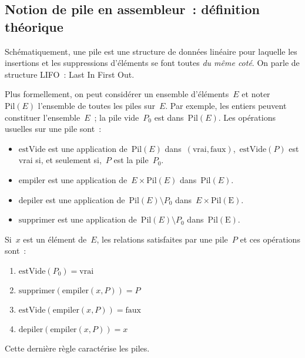 \begin{frame}
  \section{Notion de pile en assembleur~: d\'efinition th\'eorique}
Sch\'ematiquement, une pile est  une structure de donn\'ees lin\'eaire
pour laquelle les insertions et les suppressions d'\'el\'ements se font
toutes \textit{du  m\^eme    cot\'e}.     On  parle    de    structure
LIFO~: Last In First Out.
\par
Plus formellement, on peut consid\'erer un ensemble d'\'el\'ements~$E$
et  noter~$\mathrm{Pil}(E)$ l'ensemble de  toutes  les piles sur~$E$.  
Par  exemple, les entiers peuvent  constituer l'ensemble~$E$~; la pile
vide~$P_{0}$    est dans~$\mathrm{Pil}(E)$.  Les op\'erations usuelles
sur une pile sont~:
\begin{itemize}
\item $\mathrm{estVide}$   est   une application  de~$\mathrm{Pil}(E)$
  dans~${(\mathrm{vrai},\mathrm{faux})}$,~${\mathrm{estVide}(P)}$  est
  vrai si, et seulement si,~$P$ est la pile~$P_{0}$.
\item       $\mathrm{empiler}$         est         une     application
  de~${E\times\mathrm{Pil}(E)}$ dans~${\mathrm{Pil}(E)}$.
\item          $\mathrm{depiler}$          est  une       application
  de~${\mathrm{Pil}(E)\setminus P_{0}}$ dans~$E\times\mathrm{Pil(E)}$.
\item       $\mathrm{supprimer}$        est    une         application
  de~${\mathrm{Pil}(E)\setminus P_{0}}$ dans~$\mathrm{Pil(E)}$.
\end{itemize}
\newpage
Si~$x$ est un  \'el\'ement de~$E$, les  relations satisfaites par une
pile~$P$ et ces op\'erations sont~:
\begin{enumerate}
\item ${\mathrm{estVide}(P_{0})=\mathrm{vrai}}$
\item ${\mathrm{supprimer}(\mathrm{empiler}(x,P))=P}$
\item ${\mathrm{estVide}(\mathrm{empiler}(x,P))=\mathrm{faux}}$
\item ${\mathrm{depiler}(\mathrm{empiler}(x,P))=x}$
\end{enumerate}
Cette derni\`ere r\`egle caract\'erise les piles.

\end{frame}
